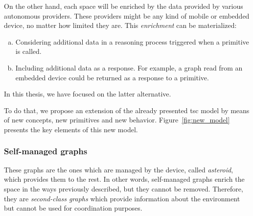 On the other hand, each space will be enriched by the data provided by various autonomous providers.
These providers might be any kind of mobile or embedded device, no matter how limited they are.
This \emph{enrichment} can be materialized:
\begin{enumerate}[(a)]
  \item Considering additional data in a reasoning process triggered when a primitive is called.
  \item Including additional data as a response.
        For example, a graph read from an embedded device could be returned as a response to a primitive.
\end{enumerate}
In this thesis, we have focused on the latter alternative.


To do that, we propose an extension of the already presented \ac{tsc} model by means of new concepts, new primitives and new behavior.
Figure~\ref{fig:new_model} presents the key elements of this new model.




\subsubsection{Self-managed graphs}

These graphs are the ones which are managed by the device, called \emph{asteroid}, which provides them to the rest.
In other words, self-managed graphs enrich the space in the ways previously described, but they cannot be removed.
Therefore, they are \emph{second-class graphs} which provide information about the environment but cannot be used for coordination purposes.

